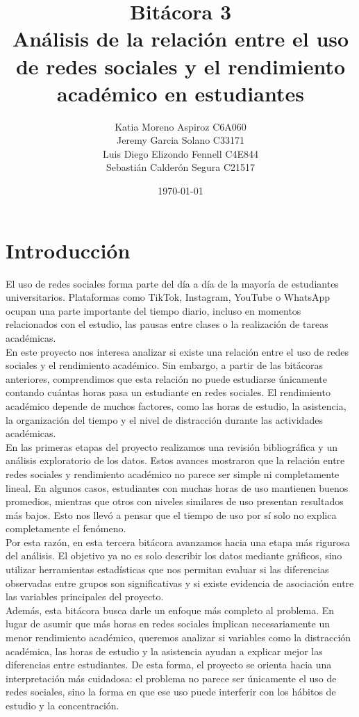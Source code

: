 \documentclass[12pt]{article}
\title{\Huge Bitácora 3\\ \Large Análisis de la relación entre el uso de redes sociales y el rendimiento académico en estudiantes}
\author{Katia Moreno Aspiroz C6A060\\
Jeremy Garcia Solano C33171\\
Luis Diego Elizondo Fennell C4E844\\
Sebastián Calderón Segura C21517}
\date{\today}
\begin{document}
\maketitle
\newpage

\tableofcontents
\newpage

\section{Introducción}
El uso de redes sociales forma parte del día a día de la mayoría de estudiantes universitarios. Plataformas como TikTok, Instagram, YouTube o WhatsApp ocupan una parte importante del tiempo diario, incluso en momentos relacionados con el estudio, las pausas entre clases o la realización de tareas académicas.
\\

En este proyecto nos interesa analizar si existe una relación entre el uso de redes sociales y el rendimiento académico. Sin embargo, a partir de las bitácoras anteriores, comprendimos que esta relación no puede estudiarse únicamente contando cuántas horas pasa un estudiante en redes sociales. El rendimiento académico depende de muchos factores, como las horas de estudio, la asistencia, la organización del tiempo y el nivel de distracción durante las actividades académicas.
\\

En las primeras etapas del proyecto realizamos una revisión bibliográfica y un análisis exploratorio de los datos. Estos avances mostraron que la relación entre redes sociales y rendimiento académico no parece ser simple ni completamente lineal. En algunos casos, estudiantes con muchas horas de uso mantienen buenos promedios, mientras que otros con niveles similares de uso presentan resultados más bajos. Esto nos llevó a pensar que el tiempo de uso por sí solo no explica completamente el fenómeno.
\\

Por esta razón, en esta tercera bitácora avanzamos hacia una etapa más rigurosa del análisis. El objetivo ya no es solo describir los datos mediante gráficos, sino utilizar herramientas estadísticas que nos permitan evaluar si las diferencias observadas entre grupos son significativas y si existe evidencia de asociación entre las variables principales del proyecto.
\\

Además, esta bitácora busca darle un enfoque más completo al problema. En lugar de asumir que más horas en redes sociales implican necesariamente un menor rendimiento académico, queremos analizar si variables como la distracción académica, las horas de estudio y la asistencia ayudan a explicar mejor las diferencias entre estudiantes. De esta forma, el proyecto se orienta hacia una interpretación más cuidadosa: el problema no parece ser únicamente el uso de redes sociales, sino la forma en que ese uso puede interferir con los hábitos de estudio y la concentración.
\\
\end{document}
